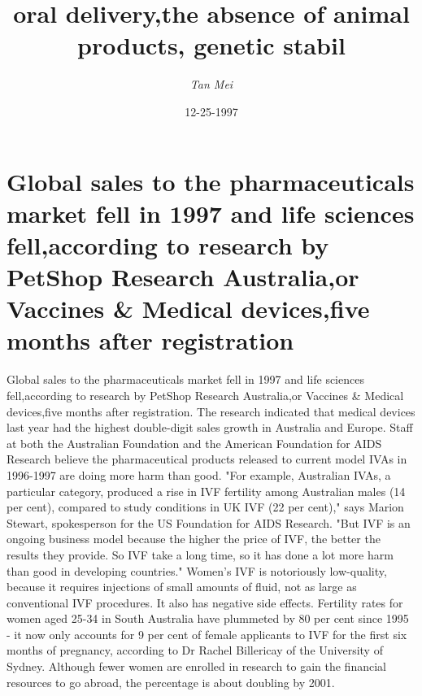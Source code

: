 \documentclass{article}%
\title{oral delivery,the absence of animal products, genetic stabil}%
\author{\textit{Tan Mei}}%
\date{12-25-1997}%
\begin{document}
%
\normalsize%
\maketitle%
\section{Global sales to the pharmaceuticals market fell in 1997 and life sciences fell,according to research by PetShop Research Australia,or Vaccines \& Medical devices,five months after registration}%
\label{sec:Globalsalestothepharmaceuticalsmarketfellin1997andlifesciencesfell,accordingtoresearchbyPetShopResearchAustralia,orVaccinesMedicaldevices,fivemonthsafterregistration}%
Global sales to the pharmaceuticals market fell in 1997 and life sciences fell,according to research by PetShop Research Australia,or Vaccines \& Medical devices,five months after registration.\newline%
The research indicated that medical devices last year had the highest double{-}digit sales growth in Australia and Europe.\newline%
Staff at both the Australian Foundation and the American Foundation for AIDS Research believe the pharmaceutical products released to current model IVAs in 1996{-}1997 are doing more harm than good.\newline%
"For example, Australian IVAs, a particular category, produced a rise in IVF fertility among Australian males (14 per cent), compared to study conditions in UK IVF (22 per cent)," says Marion Stewart, spokesperson for the US Foundation for AIDS Research.\newline%
"But IVF is an ongoing business model because the higher the price of IVF, the better the results they provide. So IVF take a long time, so it has done a lot more harm than good in developing countries."\newline%
Women's IVF is notoriously low{-}quality, because it requires injections of small amounts of fluid, not as large as conventional IVF procedures. It also has negative side effects.\newline%
Fertility rates for women aged 25{-}34 in South Australia have plummeted by 80 per cent since 1995 {-} it now only accounts for 9 per cent of female applicants to IVF for the first six months of pregnancy, according to Dr Rachel Billericay of the University of Sydney.\newline%
Although fewer women are enrolled in research to gain the financial resources to go abroad, the percentage is about doubling by 2001.\newline%
\end{document}
